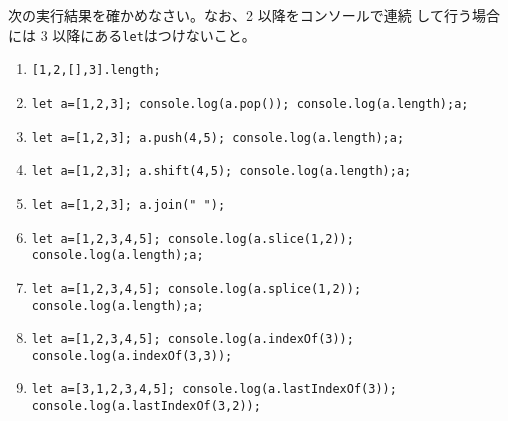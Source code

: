 \begin{Prob}\upshape
 次の実行結果を確かめなさい。なお、2 以降をコンソールで連続
 して行う場合には 3 以降にある\texttt{let}はつけないこと。
\begin{enumerate}\upshape
 \item \texttt{[1,2,[],3].length;}
 \item \texttt{let a=[1,2,3]; console.log(a.pop());
       console.log(a.length);a;}
 \item \texttt{let a=[1,2,3]; a.push(4,5); console.log(a.length);a;}
 \item \texttt{let a=[1,2,3]; a.shift(4,5); console.log(a.length);a;}
 \item \texttt{let a=[1,2,3]; a.join(" ");}
 \item \texttt{let a=[1,2,3,4,5]; console.log(a.slice(1,2)); console.log(a.length);a;}
 \item \texttt{let a=[1,2,3,4,5]; console.log(a.splice(1,2)); console.log(a.length);a;}
 \item \texttt{let a=[1,2,3,4,5]; console.log(a.indexOf(3)); console.log(a.indexOf(3,3));}
 \item \texttt{let a=[3,1,2,3,4,5]; console.log(a.lastIndexOf(3));
       console.log(a.lastIndexOf(3,2));}%
\end{enumerate}
\end{Prob}
